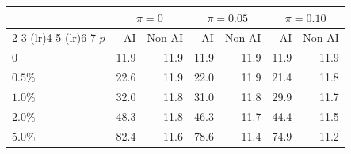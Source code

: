 \begin{tabular}{l rr rr rr}
\toprule
 & \multicolumn{2}{c}{$\pi = 0$} & \multicolumn{2}{c}{$\pi = 0.05$} & \multicolumn{2}{c}{$\pi = 0.10$} \\
\cmidrule(lr){2-3} \cmidrule(lr){4-5} \cmidrule(lr){6-7}
$p$ & AI & Non-AI & AI & Non-AI & AI & Non-AI \\
\midrule
$0$ & 11.9 & 11.9 & 11.9 & 11.9 & 11.9 & 11.9 \\
$0.5\%$ & 22.6 & 11.9 & 22.0 & 11.9 & 21.4 & 11.8 \\
$1.0\%$ & 32.0 & 11.8 & 31.0 & 11.8 & 29.9 & 11.7 \\
$2.0\%$ & 48.3 & 11.8 & 46.3 & 11.7 & 44.4 & 11.5 \\
$5.0\%$ & 82.4 & 11.6 & 78.6 & 11.4 & 74.9 & 11.2 \\
\bottomrule
\end{tabular}
